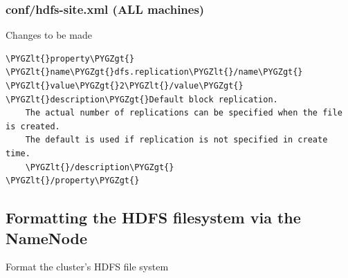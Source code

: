 \documentclass[a4paper,12pt,oneside]{sphinxmanual}
\def\PYGZlt{\char`\<}
\def\PYGZgt{\char`\>}
\begin{document}
\subsubsection{conf/hdfs-site.xml (ALL machines)}
\label{document:conf-hdfs-site-xml-all-machines}
Changes to be made

\begin{Verbatim}[commandchars=\\\{\}]
\PYGZlt{}property\PYGZgt{}
\PYGZlt{}name\PYGZgt{}dfs.replication\PYGZlt{}/name\PYGZgt{}
\PYGZlt{}value\PYGZgt{}2\PYGZlt{}/value\PYGZgt{}
\PYGZlt{}description\PYGZgt{}Default block replication.
    The actual number of replications can be specified when the file is created.
    The default is used if replication is not specified in create time.
    \PYGZlt{}/description\PYGZgt{}
\PYGZlt{}/property\PYGZgt{}
\end{Verbatim}
\begin{figure}[htbp]
\centering

\end{figure}


\subsection{Formatting the HDFS filesystem via the NameNode}
\label{document:id10}
Format the cluster’s HDFS file system
\end{document}
